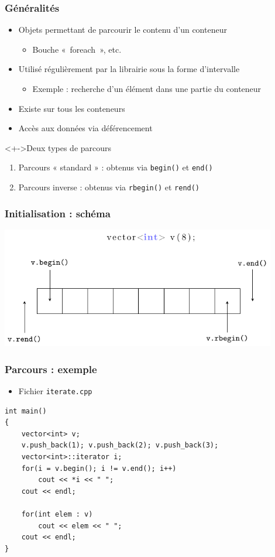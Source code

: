 \begin{frame}
\frametitle{Généralités}
\begin{itemize}[<+->]
\item Objets permettant de parcourir le contenu d'un conteneur
	\begin{itemize}
	\item Bouche «~foreach~», etc.
	\end{itemize}
\item Utilisé régulièrement par la librairie sous la forme d'intervalle
	\begin{itemize}
	\item Exemple : recherche d'un élément dans une partie du conteneur
	\end{itemize}
\item Existe sur tous les conteneurs
\item Accès aux données via déférencement
\end{itemize}
\begin{exampleblock}<+->{Deux types de parcours}
	\begin{enumerate}[<+->]
	\item Parcours « standard » : obtenus via \texttt{begin()} et \texttt{end()}
	\item Parcours inverse : obtenus via \texttt{rbegin()} et \texttt{rend()}
	\end{enumerate}
\end{exampleblock}
\end{frame}

\begin{frame}
\frametitle{Initialisation : schéma}
\begin{center}
\includegraphics[width=12cm]{pics/iterator.pdf}
\end{center}
\end{frame}

\begin{frame}[containsverbatim]
\frametitle{Parcours : exemple}
\begin{itemize}
\item Fichier \texttt{iterate.cpp}
\end{itemize}
\begin{lstlisting}
int main()
{
	vector<int> v;
	v.push_back(1); v.push_back(2); v.push_back(3);
	vector<int>::iterator i;
	for(i = v.begin(); i != v.end(); i++)
		cout << *i << " ";
	cout << endl;

	for(int elem : v)
		cout << elem << " ";
	cout << endl;
}
\end{lstlisting}
\end{frame}

